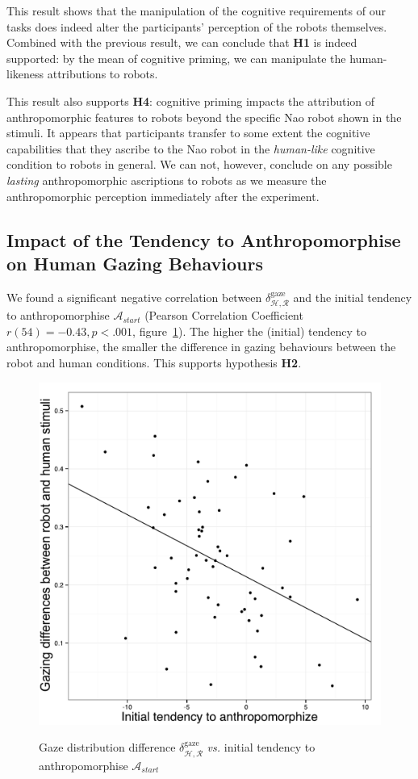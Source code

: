 \documentclass[lettersize, noapacite, twoside, HRI]{apa_HRI}
\newcommand{\vs}{\textit{vs.}\xspace}
\newcommand{\h}[1]{\textbf{H#1}\xspace}
\newcommand{\anti}{{$\mathcal{A}_{start}$\xspace}}
\newcommand{\antf}{{$\mathcal{A}_{end}$\xspace}}
\begin{document}
This result shows that the manipulation of the cognitive requirements of our
tasks does indeed alter the participants' perception of the robots themselves.
Combined with the previous result, we can conclude that \h{1} is indeed
supported: by the mean of cognitive priming, we can manipulate the
human-likeness attributions to robots.



This result also supports \h{4}: cognitive priming impacts the
attribution of anthropomorphic features to robots beyond the specific Nao robot
shown in the stimuli. It appears that participants transfer to some extent the
cognitive capabilities that they ascribe to the Nao robot in the
\emph{human-like} cognitive condition to robots in general. We can not, however,
conclude on any possible \emph{lasting} anthropomorphic ascriptions to robots as we
measure the anthropomorphic perception immediately after the experiment.


\subsection{Impact of the Tendency to Anthropomorphise on Human
Gazing Behaviours}

We found a significant negative correlation between
$\delta_{\mathcal{H},\mathcal{R}}^{\text{gaze}}$ and
the initial tendency to anthropomorphise \anti{} (Pearson Correlation Coefficient $r(54) = -0.43,
p < .001$, figure~\ref{h2}). The higher the (initial) tendency to anthropomorphise, the smaller
the difference in gazing behaviours between the robot and human conditions. This
supports hypothesis \h{2}.

\begin{figure}
    \centering
    \includegraphics[width=0.5\columnwidth]{H2}\label{GazeDifference-vs-ICA}
    \caption{Gaze distribution difference $\delta_{\mathcal{H},
    \mathcal{R}}^{\text{gaze}}$ \vs initial tendency to anthropomorphise \anti{}}
    \label{h2}
\end{figure}
\end{document}

